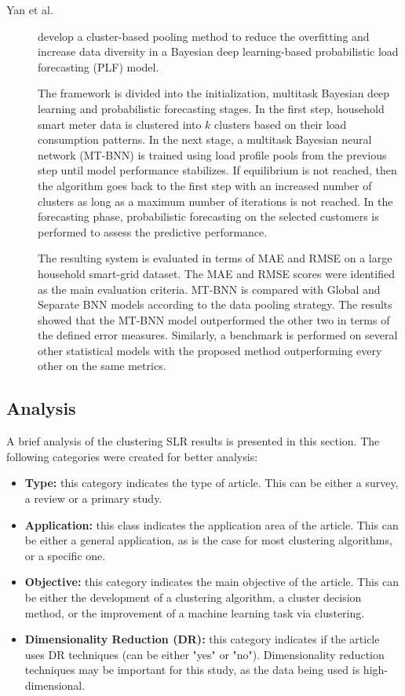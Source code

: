 \begin{description}
    \item[Yan et al.]\cite{Yang.Li.ea_BayesianDeepLearningBased_2020} develop a cluster-based pooling method to reduce the overfitting and increase data diversity in a Bayesian deep learning-based probabilistic load forecasting (PLF) model. 
    
    The framework is divided into the initialization, multitask Bayesian deep learning and probabilistic forecasting stages. In the first step, household smart meter data is clustered into $k$ clusters based on their load consumption patterns. In the next stage, a multitask Bayesian neural network (MT-BNN) is trained using load profile pools from the previous step until model performance stabilizes. If equilibrium is not reached, then the algorithm goes back to the first step with an increased number of clusters as long as a maximum number of iterations is not reached. In the forecasting phase, probabilistic forecasting on the selected customers is performed to assess the predictive performance.

    The resulting system is evaluated in terms of MAE and RMSE on a large household smart-grid dataset. The MAE and RMSE scores were identified as the main evaluation criteria. MT-BNN is compared with Global and Separate BNN models according to the data pooling strategy. The results showed that the MT-BNN model outperformed the other two in terms of the defined error measures. Similarly, a benchmark is performed on several other statistical models with the proposed method outperforming every other on the same metrics. 
\end{description}

\subsection{Analysis}\label{sec:sota_clustering_analysis}
A brief analysis of the clustering SLR results is presented in this section. The following categories were created for better analysis:

\begin{itemize}
    \item \textbf{Type:} this category indicates the type of article. This can be either a survey, a review or a primary study.
    \item \textbf{Application:} this class indicates the application area of the article. This can be either a general application, as is the case for most clustering algorithms, or a specific one.
    \item \textbf{Objective:} this category indicates the main objective of the article. This can be either the development of a clustering algorithm, a cluster decision method, or the improvement of a machine learning task via clustering.
    \item \textbf{Dimensionality Reduction (DR):} this category indicates if the article uses DR techniques (can be either "yes" or "no"). Dimensionality reduction techniques may be important for this study, as the data being used is high-dimensional. 
\end{itemize}


